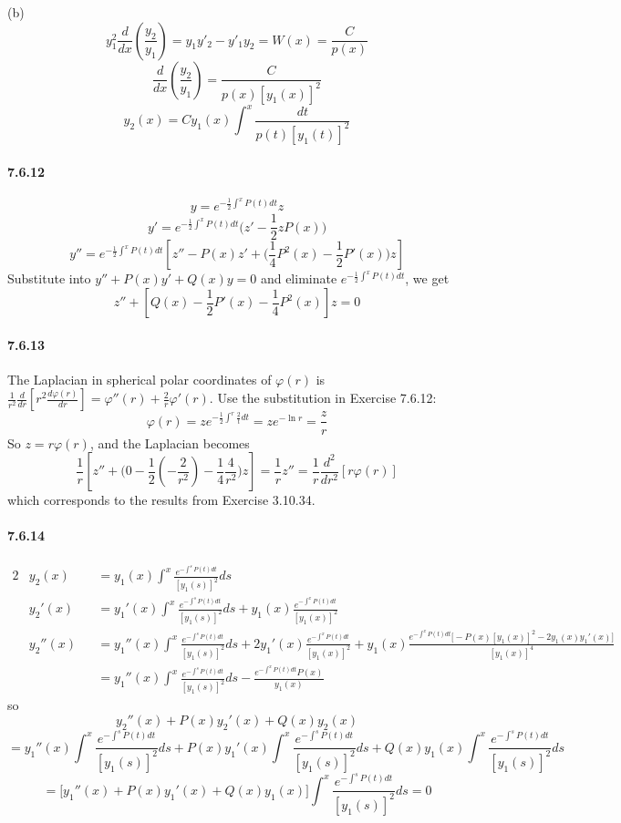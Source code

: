 \documentclass[a4paper]{article}
\begin{document}
(b)
\[
y_1^2\frac{d}{dx}(\frac{y_2}{y_1})=y_1y'_2-y'_1y_2=W(x)=\frac{C}{p(x)}
\]
\[
\frac{d}{dx}(\frac{y_2}{y_1})=\frac{C}{p(x)[y_1(x)]^2}
\]
\[
y_2(x)=Cy_1(x)\int^x\frac{dt}{p(t)[y_1(t)]^2}
\]

\paragraph{7.6.12}
\[
y=e^{-\frac{1}{2}\int^xP(t)dt}z
\]
\[
y'=e^{-\frac{1}{2}\int^xP(t)dt}\Big(z'-\frac{1}{2}zP(x)\Big)
\]
\[
y''=e^{-\frac{1}{2}\int^xP(t)dt}\left[z''-P(x)z'+\Big(\frac{1}{4}P^2(x)-\frac{1}{2}P'(x)\Big)z \right]
\]
Substitute into $y''+P(x)y'+Q(x)y=0$ and eliminate $e^{-\frac{1}{2}\int^xP(t)dt}$, we get
\[
z''+\left[Q(x)-\frac{1}{2}P'(x)-\frac{1}{4}P^2(x) \right]z=0
\]

\paragraph{7.6.13}
The Laplacian in spherical polar coordinates of $\varphi(r)$ is $\frac{1}{r^2}\frac{d}{dr}\left[r^2\frac{d\varphi(r)}{dr}\right]=\varphi''(r)+\frac{2}{r}\varphi'(r)$. 
Use the substitution in Exercise 7.6.12:
\[
\varphi(r)=ze^{-\frac{1}{2}\int^r\frac{2}{t}dt}=ze^{-\ln r}=\frac{z}{r}
\]
So $z=r\varphi(r)$, and the Laplacian becomes \[\frac{1}{r}\left[z''+\Big(0-\frac{1}{2}(-\frac{2}{r^2})-\frac{1}{4}\frac{4}{r^2}\Big)z \right]=\frac{1}{r}z''=\frac{1}{r}\frac{d^2}{dr^2}[r\varphi(r)]
\]
which corresponds to the results from Exercise 3.10.34.

\paragraph{7.6.14}
\begin{alignat*}{2}
    & y_2(x)&&=y_1(x)\int^x\frac{e^{-\int^sP(t)dt}}{[y_1(s)]^2}ds\\
    & y_2'(x)&&=y_1'(x)\int^x\frac{e^{-\int^sP(t)dt}}{[y_1(s)]^2}ds+y_1(x)\frac{e^{-\int^xP(t)dt}}{[y_1(x)]^2}\\
    & y_2''(x)&&=y_1''(x)\int^x\frac{e^{-\int^sP(t)dt}}{[y_1(s)]^2}ds+2y_1'(x)\frac{e^{-\int^xP(t)dt}}{[y_1(x)]^2}+y_1(x)\frac{e^{-\int^xP(t)dt}\big[-P(x)[y_1(x)]^2-2y_1(x)y_1'(x)\big]}{[y_1(x)]^4}\\
    & &&=y_1''(x)\int^x\frac{e^{-\int^sP(t)dt}}{[y_1(s)]^2}ds-\frac{e^{-\int^xP(t)dt}P(x)}{y_1(x)}
\end{alignat*}
so
\[
y_2''(x)+P(x)y_2'(x)+Q(x)y_2(x)\]
\[
=y_1''(x)\int^x\frac{e^{-\int^sP(t)dt}}{[y_1(s)]^2}ds+P(x)y_1'(x)\int^x\frac{e^{-\int^sP(t)dt}}{[y_1(s)]^2}ds+Q(x)y_1(x)\int^x\frac{e^{-\int^sP(t)dt}}{[y_1(s)]^2}ds
\]
\[
=\big[y_1''(x)+P(x)y_1'(x)+Q(x)y_1(x)\big]\int^x\frac{e^{-\int^sP(t)dt}}{[y_1(s)]^2}ds=0
\]
\end{document}
